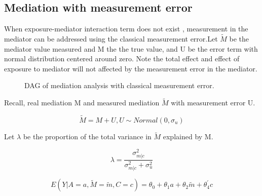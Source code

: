 \documentclass{article}
\begin{document}
\subsection{Mediation with measurement error}

When exposure-mediator interaction term does not exist , measurement in the mediator can be addressed using the classical measurement error\cite{le2012quantification}.Let $\tilde M $ be the mediator value measured and M the the true value, and U be the error term with normal distribution centered around zero. Note the total effect and effect of exposure to mediator will not affected by the measurement error in the mediator\cite{carroll2006measurement}\cite{le2012quantification}.


\begin{figure}[h]
\centering
{}
\caption{DAG of mediation analysis with classical measurement error.  }
\label{dag1}
\end{figure}

Recall, real mediation M and measured mediation $\tilde M$ with measurement error U.\newline

\begin{equation}
\tilde M = M + U, U \sim Normal(0, \sigma_u)
\end{equation}

Let $\lambda$ be the proportion of the total variance in $\tilde M $ explained by M. 


\begin{equation}
\lambda = \frac{\sigma_{m|c}^2}{\sigma_{m|c}^2 + \sigma_{u}^2}
\end{equation}

\begin{equation}
E(Y | A = a, \tilde M = \tilde m, C =c) = \theta_0+\theta_1 a+ \theta_2 \tilde m  + \theta_4^{'} c
\end{equation}
\end{document}
